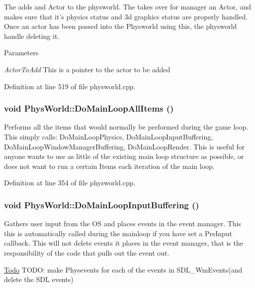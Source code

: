 The adds and Actor to the physworld. The takes over for manager an Actor, and makes sure that it's physics status and 3d graphics status are properly handled. Once an actor has been passed into the Physworld using this, the physworld handle deleting it. 
\begin{DoxyParams}{Parameters}
\item[{\em ActorToAdd}]This is a pointer to the actor to be added \end{DoxyParams}


Definition at line 519 of file physworld.cpp.\hypertarget{classPhysWorld_a60b7978b39fc347c2f37077737783da6}{
\subsubsection[{DoMainLoopAllItems}]{\setlength{\rightskip}{0pt plus 5cm}void PhysWorld::DoMainLoopAllItems ()}}
\label{db/df5/classPhysWorld_a60b7978b39fc347c2f37077737783da6}


Performs all the items that would normally be performed during the game loop. This simply calls: DoMainLoopPhysics, DoMainLoopInputBuffering, DoMainLoopWindowManagerBuffering, DoMainLoopRender. This is useful for anyone wants to use as little of the existing main loop structure as possible, or does not want to run a certain Items each iteration of the main loop. 

Definition at line 354 of file physworld.cpp.\hypertarget{classPhysWorld_a81b3f0dcc0a90d039623f696343e6e9c}{
\subsubsection[{DoMainLoopInputBuffering}]{\setlength{\rightskip}{0pt plus 5cm}void PhysWorld::DoMainLoopInputBuffering ()}}
\label{db/df5/classPhysWorld_a81b3f0dcc0a90d039623f696343e6e9c}


Gathers user input from the OS and places events in the event manager. This this is automatically called during the mainloop if you have set a PreInput callback. This will not delete events it places in the event manager, that is the responsibility of the code that pulls out the event out. 

\begin{Desc}
\item[\hyperlink{todo__todo000010}{Todo}]TODO: make Physevents for each of the events in SDL\_\-WmEvents(and delete the SDL events) \end{Desc}


